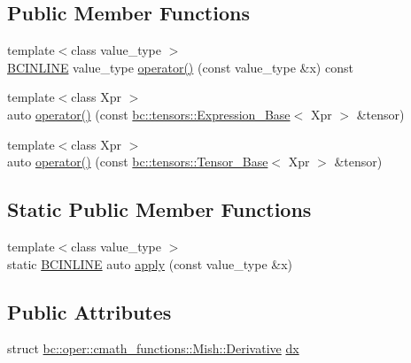 \subsection*{Public Member Functions}
\begin{DoxyCompactItemize}
\item 
{\footnotesize template$<$class value\+\_\+type $>$ }\\\hyperlink{common_8h_a6699e8b0449da5c0fafb878e59c1d4b1}{B\+C\+I\+N\+L\+I\+NE} value\+\_\+type \hyperlink{structbc_1_1oper_1_1cmath__functions_1_1Mish_a13d5c78140216f39a548413fd6bc2705}{operator()} (const value\+\_\+type \&x) const
\item 
{\footnotesize template$<$class Xpr $>$ }\\auto \hyperlink{structbc_1_1oper_1_1cmath__functions_1_1Mish_ac6f8dae1eec1b5292eb14d4032a59f80}{operator()} (const \hyperlink{classbc_1_1tensors_1_1Expression__Base}{bc\+::tensors\+::\+Expression\+\_\+\+Base}$<$ Xpr $>$ \&tensor)
\item 
{\footnotesize template$<$class Xpr $>$ }\\auto \hyperlink{structbc_1_1oper_1_1cmath__functions_1_1Mish_a49f22b21cc155c2031eba78fd7908605}{operator()} (const \hyperlink{classbc_1_1tensors_1_1Tensor__Base}{bc\+::tensors\+::\+Tensor\+\_\+\+Base}$<$ Xpr $>$ \&tensor)
\end{DoxyCompactItemize}
\subsection*{Static Public Member Functions}
\begin{DoxyCompactItemize}
\item 
{\footnotesize template$<$class value\+\_\+type $>$ }\\static \hyperlink{common_8h_a6699e8b0449da5c0fafb878e59c1d4b1}{B\+C\+I\+N\+L\+I\+NE} auto \hyperlink{structbc_1_1oper_1_1cmath__functions_1_1Mish_a19910b3ca202773e3fe06814ac2f9871}{apply} (const value\+\_\+type \&x)
\end{DoxyCompactItemize}
\subsection*{Public Attributes}
\begin{DoxyCompactItemize}
\item 
struct \hyperlink{structbc_1_1oper_1_1cmath__functions_1_1Mish_1_1Derivative}{bc\+::oper\+::cmath\+\_\+functions\+::\+Mish\+::\+Derivative} \hyperlink{structbc_1_1oper_1_1cmath__functions_1_1Mish_a4351fe9f41d7a7d5416435284617e3a6}{dx}
\end{DoxyCompactItemize}


